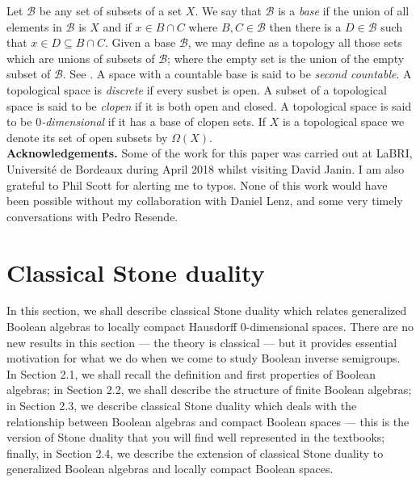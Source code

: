 \documentclass[a4paper]{amsart}
\begin{document}
Let $\mathscr{B}$ be any set of subsets of a set $X$.
We say that $\mathscr{B}$ is a {\em base} if the union of all elements in $\mathscr{B}$ is $X$
and if $x \in B \cap C$ where $B,C \in \mathscr{B}$ then there is a $D \in \mathscr{B}$ such that
$x \in D \subseteq B \cap C$.
Given a base $\mathscr{B}$, we may define as a topology all those sets which are unions of subsets of $\mathscr{B}$;
where the empty set is the union of the empty subset of $\mathscr{B}$.
See \cite[Theorem 5.3]{Willard}.
A space with a countable base is said to be {\em second countable}.
A topological space is {\em discrete} if every susbet is open.
A subset of a topological space is said to be {\em clopen}
if it is both open and closed.
A topological space is said to be {\em $0$-dimensional} if it has a base of clopen sets.
If $X$ is a topological space we denote its set of open subsets by $\Omega (X)$.\\

\noindent
{\bf Acknowledgements. }Some of the work for this paper was carried out at LaBRI, Universit\'e de Bordeaux during April 2018 whilst visiting David Janin.
I am also grateful to Phil Scott for alerting me to typos.
None of this work would have been possible without my collaboration with Daniel Lenz, 
and some very timely conversations with Pedro Resende.


\section{Classical Stone duality}

In this section, we shall describe classical Stone duality which relates generalized Boolean algebras
to locally compact Hausdorff $0$-dimensional spaces.
There are no new results in this section --- the theory is classical --- but it provides essential motivation for what we do
when we come to study Boolean inverse semigroups.
In Section 2.1, we shall recall the definition and first properties of Boolean algebras;
in Section 2.2, we shall describe the structure of finite Boolean algebras;
in Section 2.3, we describe classical Stone duality which deals with the relationship between Boolean algebras and compact Boolean spaces
---
this is the version of Stone duality that you will find well represented in the textbooks;
finally, in Section 2.4, we describe the extension of classical Stone duality to generalized Boolean algebras and locally compact Boolean spaces.
\end{document}
